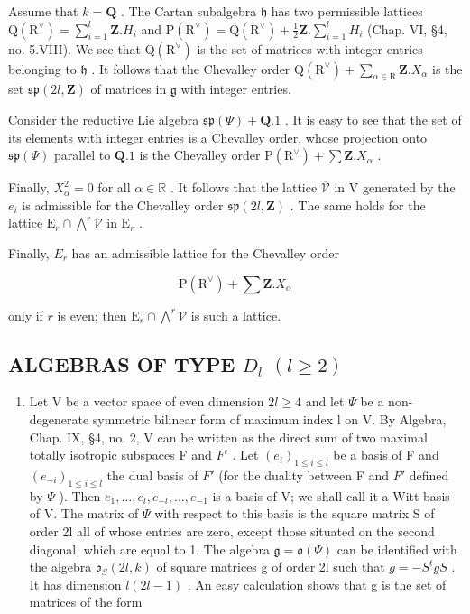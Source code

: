 Assume that \(k = \mathbf{Q}\) . The Cartan subalgebra \(\mathfrak{h}\) has two permissible lattices \(\mathrm{Q}(\mathrm{R}^{\vee}) = \sum_{i=1}^{l} \mathbf{Z}.H_i\) and \(\mathrm{P}(\mathrm{R}^{\vee}) = \mathrm{Q}(\mathrm{R}^{\vee}) + \frac{1}{2}\mathbf{Z}. \sum_{i=1}^{l} H_i\) (Chap. VI, §4, no. 5.VIII). We see that \(\mathrm{Q}(\mathrm{R}^{\vee})\) is the set of matrices with integer entries belonging to \(\mathfrak{h}\) . It follows that the Chevalley order \(\mathrm{Q}(\mathrm{R}^{\vee}) + \sum_{\alpha \in \mathrm{R}} \mathbf{Z}.X_{\alpha}\) is the set \(\mathfrak{sp}(2l,\mathbf{Z})\) of matrices in \(\mathfrak{g}\) with integer entries.

Consider the reductive Lie algebra \(\mathfrak{sp}(\varPsi) + \mathbf{Q}.1\) . It is easy to see that the set of its elements with integer entries is a Chevalley order, whose projection onto \(\mathfrak{sp}(\varPsi)\) parallel to \(\mathbf{Q}.1\) is the Chevalley order \(\mathrm{P}(\mathrm{R}^{\vee}) + \sum \mathbf{Z}.X_{\alpha}\) .

Finally, \(X_{\alpha}^{2} = 0\) for all \(\alpha \in \mathbb{R}\) . It follows that the lattice \(\overline{\mathcal{V}}\) in \(\mathrm{V}\) generated by the \(e_i\) is admissible for the Chevalley order \(\mathfrak{sp}(2l,\mathbf{Z})\) . The same holds for the lattice \(\mathrm{E}_r \cap \bigwedge^r \mathcal{V}\) in \(\mathrm{E}_r\) .

Finally, \(E_{r}\) has an admissible lattice for the Chevalley order

\[
\mathrm{P} (\mathrm{R} ^ {\vee}) + \sum \mathbf {Z}. X _ {\alpha}
\]

only if \(r\) is even; then \(\mathrm{E}_r\cap \bigwedge^r\mathcal{V}\) is such a lattice.

\subsection{\texorpdfstring{ALGEBRAS OF TYPE \(D_{l}\) \((l\geq 2)\)}{ALGEBRAS OF TYPE D\_\{l\} (l\textbackslash geq 2)}}

\begin{enumerate}
\def\labelenumi{(\Roman{enumi})}
\tightlist
\item
  Let V be a vector space of even dimension \(2l \geq 4\) and let \(\varPsi\) be a non-degenerate symmetric bilinear form of maximum index l on V. By Algebra, Chap. IX, §4, no. 2, V can be written as the direct sum of two maximal totally isotropic subspaces F and \(F'\) . Let \((e_i)_{1 \leq i \leq l}\) be a basis of F and \((e_{-i})_{1 \leq i \leq l}\) the dual basis of \(F'\) (for the duality between F and \(F'\) defined by \(\varPsi\) ). Then \(e_1, \ldots, e_l, e_{-l}, \ldots, e_{-1}\) is a basis of V; we shall call it a Witt basis of V. The matrix of \(\varPsi\) with respect to this basis is the square matrix S of order 2l all of whose entries are zero, except those situated on the second diagonal, which are equal to 1. The algebra \(\mathfrak{g} = \mathfrak{o}(\varPsi)\) can be identified with the algebra \(\mathfrak{o}_S(2l, k)\) of square matrices g of order 2l such that \(g = -S^t g S\) . It has dimension \(l(2l - 1)\) . An easy calculation shows that g is the set of matrices of the form
\end{enumerate}

